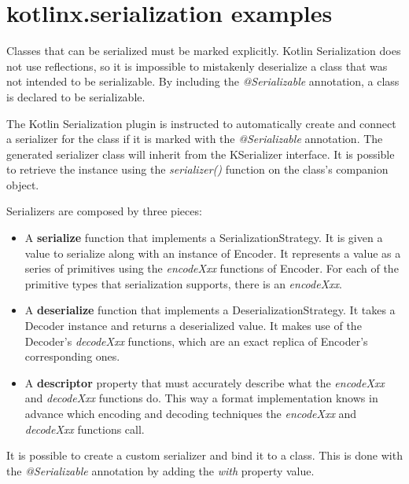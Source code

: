 \section{kotlinx.serialization examples}
\label{sec:kotlinx-serialization-examples}
Classes that can be serialized must be marked explicitly. Kotlin Serialization does not use reflections, so it is impossible to mistakenly deserialize a class that was not intended to be serializable. By including the \textit{@Serializable} annotation, a class is declared to be serializable.



\noindent The Kotlin Serialization plugin is instructed to automatically create and connect a serializer for the class if it is marked with the \textit{@Serializable} annotation. The generated serializer class will inherit from the KSerializer interface. It is possible to retrieve the instance using the \textit{serializer()} function on the class's companion object.

Serializers are composed by three pieces:

\begin{itemize}
	\item A \textbf{serialize} function that implements a SerializationStrategy. It is given a value to serialize along with an instance of Encoder. It represents a value as a series of primitives using the \textit{encodeXxx} functions of Encoder. For each of the primitive types that serialization supports, there is an \textit{encodeXxx}.
	\item A \textbf{deserialize} function that implements a DeserializationStrategy. It takes a Decoder instance and returns a deserialized value. It makes use of the Decoder's \textit{decodeXxx} functions, which are an exact replica of Encoder's corresponding ones.
	\item A \textbf{descriptor} property that must accurately describe what the \textit{encodeXxx} and \textit{decodeXxx} functions do. This way a format implementation knows in advance which encoding and decoding techniques the \textit{encodeXxx} and \textit{decodeXxx} functions call.
\end{itemize}

It is possible to create a custom serializer and bind it to a class. This is done with the \textit{@Serializable} annotation by adding the \textit{with} property value.

